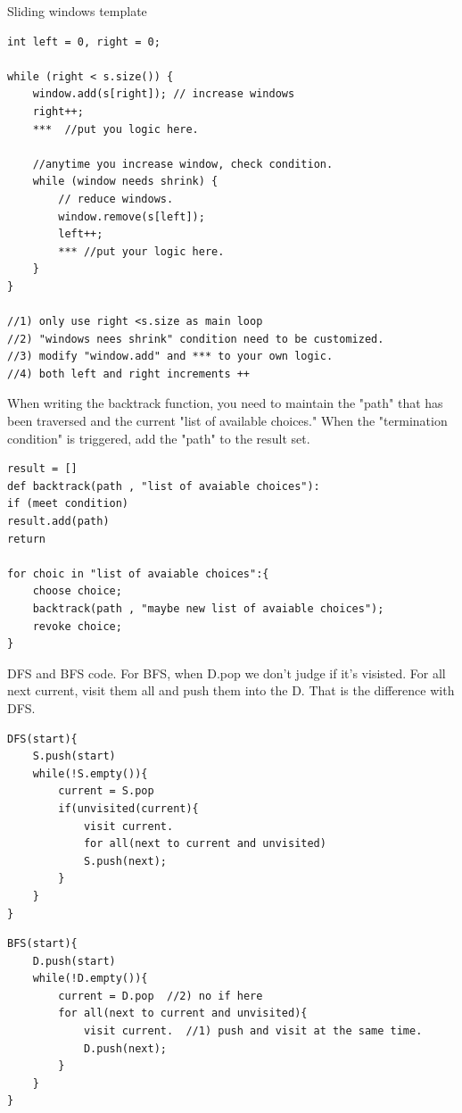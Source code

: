 \documentclass[a4paper,11pt,twoside]{book}
\begin{document}
	\par Sliding windows template 

\begin{lstlisting}
int left = 0, right = 0;

while (right < s.size()) {
	window.add(s[right]); // increase windows
	right++;
	***  //put you logic here.
	
	//anytime you increase window, check condition. 
	while (window needs shrink) {
		// reduce windows.
		window.remove(s[left]);
		left++;
		*** //put your logic here. 
	}
}

//1) only use right <s.size as main loop
//2) "windows nees shrink" condition need to be customized. 
//3) modify "window.add" and *** to your own logic. 
//4) both left and right increments ++		
\end{lstlisting}	

	\par When writing the backtrack function, you need to maintain the "path" that has been traversed and the current "list of available choices." When the "termination condition" is triggered, add the "path" to the result set.

\begin{lstlisting}
result = []
def backtrack(path , "list of avaiable choices"):
if (meet condition)
result.add(path)
return

for choic in "list of avaiable choices":{
	choose choice;
	backtrack(path , "maybe new list of avaiable choices");
	revoke choice;
}			
\end{lstlisting}	

	\par DFS and BFS code. For BFS, when D.pop we don't judge if it's visisted.  For all next current, visit them all and push them into the D. That is the difference with DFS.
\begin{lstlisting}
DFS(start){
	S.push(start)  
	while(!S.empty()){
		current = S.pop
		if(unvisited(current){
			visit current.
			for all(next to current and unvisited)
			S.push(next);
		}
	}
}			
\end{lstlisting}	

\begin{lstlisting} 
BFS(start){
	D.push(start)  
	while(!D.empty()){
		current = D.pop  //2) no if here
		for all(next to current and unvisited){
			visit current.  //1) push and visit at the same time. 
			D.push(next);
		}
	}
}		
\end{lstlisting}	


%
\end{document}
